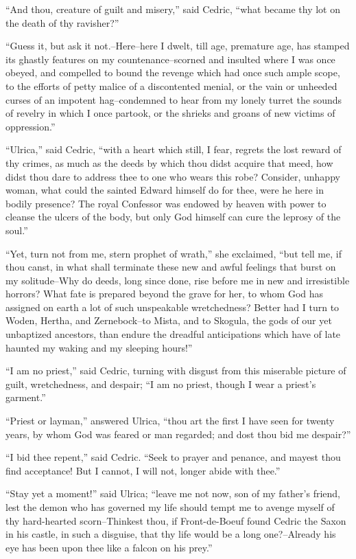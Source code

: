 ``And thou, creature of guilt and misery,'' said Cedric, ``what became
thy lot on the death of thy ravisher?''

``Guess it, but ask it not.--Here--here I dwelt, till age, premature
age, has stamped its ghastly features on my countenance--scorned and
insulted where I was once obeyed, and compelled to bound the revenge
which had once such ample scope, to the efforts of petty malice of a
discontented menial, or the vain or unheeded curses of an impotent
hag--condemned to hear from my lonely turret the sounds of revelry in
which I once partook, or the shrieks and groans of new victims of
oppression.''

``Ulrica,'' said Cedric, ``with a heart which still, I fear, regrets the
lost reward of thy crimes, as much as the deeds by which thou didst
acquire that meed, how didst thou dare to address thee to one who wears
this robe? Consider, unhappy woman, what could the sainted Edward
himself do for thee, were he here in bodily presence? The royal
Confessor was endowed by heaven with power to cleanse the ulcers of the
body, but only God himself can cure the leprosy of the soul.''

``Yet, turn not from me, stern prophet of wrath,'' she exclaimed, ``but
tell me, if thou canst, in what shall terminate these new and awful
feelings that burst on my solitude--Why do deeds, long since done, rise
before me in new and irresistible horrors? What fate is prepared beyond
the grave for her, to whom God has assigned on earth a lot of such
unspeakable wretchedness? Better had I turn to Woden, Hertha, and
Zernebock--to Mista, and to Skogula, the gods of our yet unbaptized
ancestors, than endure the dreadful anticipations which have of late
haunted my waking and my sleeping hours!''

``I am no priest,'' said Cedric, turning with disgust from this
miserable picture of guilt, wretchedness, and despair; ``I am no priest,
though I wear a priest's garment.''

``Priest or layman,'' answered Ulrica, ``thou art the first I have seen
for twenty years, by whom God was feared or man regarded; and dost thou
bid me despair?''

``I bid thee repent,'' said Cedric. ``Seek to prayer and penance, and
mayest thou find acceptance! But I cannot, I will not, longer abide with
thee.''

``Stay yet a moment!'' said Ulrica; ``leave me not now, son of my
father's friend, lest the demon who has governed my life should tempt me
to avenge myself of thy hard-hearted scorn--Thinkest thou, if
Front-de-Boeuf found Cedric the Saxon in his castle, in such a disguise,
that thy life would be a long one?--Already his eye has been upon thee
like a falcon on his prey.''

